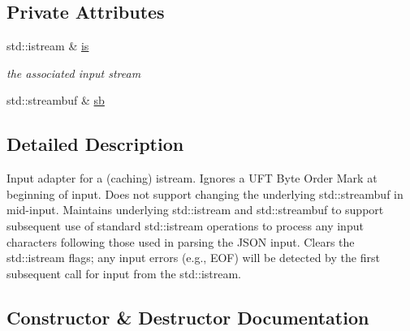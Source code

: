 \subsection*{Private Attributes}
\begin{DoxyCompactItemize}
\item 
std\+::istream \& \hyperlink{classnlohmann_1_1detail_1_1input__stream__adapter_ac3afada8eaf7d6cd2b475a3388d5e992}{is}
\begin{DoxyCompactList}\small\item\em the associated input stream \end{DoxyCompactList}\item 
std\+::streambuf \& \hyperlink{classnlohmann_1_1detail_1_1input__stream__adapter_addd96de4b5cbd9925ed5d8a0f0261143}{sb}
\end{DoxyCompactItemize}


\subsection{Detailed Description}
Input adapter for a (caching) istream. Ignores a U\+FT Byte Order Mark at beginning of input. Does not support changing the underlying std\+::streambuf in mid-\/input. Maintains underlying std\+::istream and std\+::streambuf to support subsequent use of standard std\+::istream operations to process any input characters following those used in parsing the J\+S\+ON input. Clears the std\+::istream flags; any input errors (e.\+g., E\+OF) will be detected by the first subsequent call for input from the std\+::istream. 

\subsection{Constructor \& Destructor Documentation}
